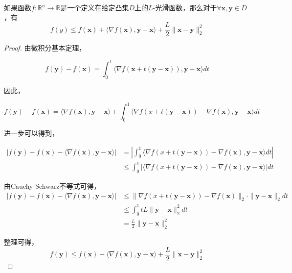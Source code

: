 \begin{theorem}[下降引理]
    如果函数$f: \mathbb{R}^{n}\rightarrow \mathbb{R}$是一个定义在给定凸集$D$上的$L$-光滑函数，那么对于$\forall \bm{x}, \bm{y}\in D$，有
    \begin{equation}
        f(y) \leq f(\bm{x}) + \langle \nabla f(\bm{x}), \bm{y}-\bm{x} \rangle + \frac{L}{2}\|\bm{x}-\bm{y}\|_{2}^{2}
    \end{equation}
    \label{thm435}
\end{theorem}

\begin{proof}
    由微积分基本定理，
    
    \begin{equation*}
        f(\bm{y}) - f(\bm{x}) = \int_{0}^{1}\langle \nabla f(\bm{x} + t(\bm{y} - \bm{x})), \bm{y}-\bm{x}\rangle dt
    \end{equation*}

    因此，

    \begin{equation*}
        f(\bm{y}) - f(\bm{x}) = \langle \nabla f(\bm{x}), \bm{y}-\bm{x}\rangle + \int_{0}^{1}\langle \nabla f(x+t(\bm{y}-\bm{x})) - \nabla f(\bm{x}), \bm{y}-\bm{x}\rangle dt
    \end{equation*}

    进一步可以得到，

    \begin{equation*}
        \begin{split}
            |f(\bm{y}) - f(\bm{x}) - \langle \nabla f(\bm{x}), \bm{y}-\bm{x}\rangle| &= |\int_{0}^{1}\langle \nabla f(x+t(\bm{y}-\bm{x})) - \nabla f(\bm{x}), \bm{y}-\bm{x}\rangle dt| \\
            &\leq \int_{0}^{1} |\langle \nabla f(x+t(\bm{y}-\bm{x})) - \nabla f(\bm{x}), \bm{y}-\bm{x}\rangle| dt
        \end{split}
    \end{equation*}

    由Cauchy-Schwarz不等式可得，
    \begin{equation*}
        \begin{split}
            |f(\bm{y}) - f(\bm{x}) - \langle \nabla f(\bm{x}), \bm{y}-\bm{x}\rangle| &\leq \|\nabla f(x+t(\bm{y}-\bm{x})) - \nabla f(\bm{x})\|_{2} \cdot \|\bm{y}-\bm{x}\|_{2} dt \\
            &\leq \int_{0}^{1} tL\|\bm{y}-\bm{x}\|_{2}^{2}dt \\
            &= \frac{L}{2} \|\bm{y}-\bm{x}\|_{2}^{2}
        \end{split}
    \end{equation*}

    整理可得，
    \begin{equation*}
        f(\bm{y}) \leq f(\bm{x}) + \langle \nabla f(\bm{x}), \bm{y}-\bm{x} \rangle + \frac{L}{2}\|\bm{x}-\bm{y}\|_{2}^{2}
    \end{equation*}
\end{proof}



